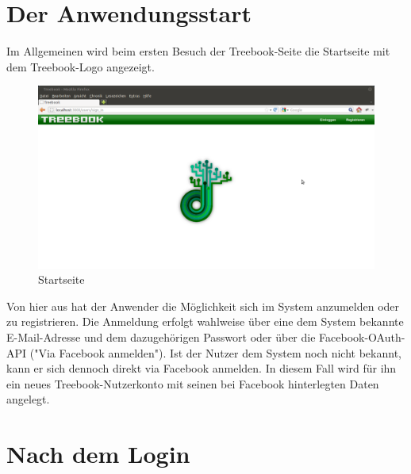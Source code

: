 \documentclass[10pt,a4paper]{book}
\makeatletter
\def\ScaleIfNeeded{%
\ifdim\Gin@nat@width>\linewidth
\linewidth
\else
\Gin@nat@width
\fi
}
\makeatother
\begin{document}
\section{Der Anwendungsstart}
Im Allgemeinen wird beim ersten Besuch der Treebook-Seite die Startseite mit dem Treebook-Logo angezeigt.
\begin{figure}[htbp]
\centering
\includegraphics[width=\ScaleIfNeeded]{Pictures/screen_startup.png}%
\caption{Startseite}%
\end{figure}
Von hier aus hat der Anwender die Möglichkeit sich im System anzumelden oder zu registrieren.
Die Anmeldung erfolgt wahlweise über eine dem System bekannte E-Mail-Adresse und dem dazugehörigen Passwort oder über die Facebook-OAuth-API ("Via Facebook anmelden").
Ist der Nutzer dem System noch nicht bekannt, kann er sich dennoch direkt via Facebook anmelden. In diesem Fall wird für ihn ein neues Treebook-Nutzerkonto mit seinen bei Facebook hinterlegten Daten angelegt.

\section{Nach dem Login}
\end{document}
